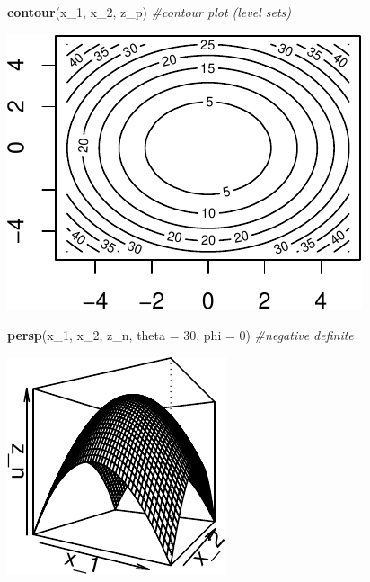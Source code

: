\documentclass[11pt,]{article}
\newenvironment{Shaded}{\begin{snugshade}}{\end{snugshade}}
\newcommand{\KeywordTok}[1]{\textcolor[rgb]{0.13,0.29,0.53}{\textbf{#1}}}
\newcommand{\DataTypeTok}[1]{\textcolor[rgb]{0.13,0.29,0.53}{#1}}
\newcommand{\DecValTok}[1]{\textcolor[rgb]{0.00,0.00,0.81}{#1}}
\newcommand{\CommentTok}[1]{\textcolor[rgb]{0.56,0.35,0.01}{\textit{#1}}}
\newcommand{\NormalTok}[1]{#1}
\begin{document}
\begin{Shaded}
\begin{Highlighting}[]
\KeywordTok{contour}\NormalTok{(x_}\DecValTok{1}\NormalTok{, x_}\DecValTok{2}\NormalTok{, z_p) }\CommentTok{#contour plot (level sets)}
\end{Highlighting}
\end{Shaded}

\begin{center}\includegraphics{Optimization_files/figure-latex/FOC_dim_2-2} \end{center}

\begin{Shaded}
\begin{Highlighting}[]
\KeywordTok{persp}\NormalTok{(x_}\DecValTok{1}\NormalTok{, x_}\DecValTok{2}\NormalTok{, z_n, }\DataTypeTok{theta =} \DecValTok{30}\NormalTok{, }\DataTypeTok{phi =} \DecValTok{0}\NormalTok{) }\CommentTok{#negative definite}
\end{Highlighting}
\end{Shaded}

\begin{center}\includegraphics{Optimization_files/figure-latex/FOC_dim_2-3} \end{center}
\end{document}
